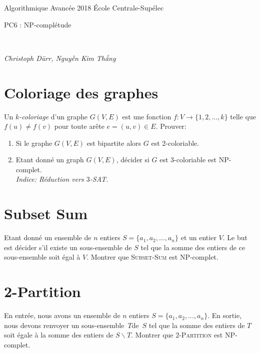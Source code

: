 \documentclass[12pt]{article}
\newcommand{\MakeScribeTop}[1]{
\noindent
\begin{framed}
\noindent
 Algorithmique Avancée 2018
 \hfill
 École Centrale-Supélec
 \\[1em]
 \centerline{ \Large
#1
 }
 \\[1em]
\centerline{  \it Christoph Dürr, Nguyễn Kim Thắng}
\end{framed}
}
\begin{document}
    \MakeScribeTop{PC6 : NP-complétude}

\section{Coloriage des graphes}
Un \emph{$k$-coloriage} d'un graphe $G(V,E)$ est une fonction $f: V \rightarrow \{1,2, \ldots, k\}$ telle que 
$f(u) \neq f(v)$ pour toute arête $e = (u,v) \in E$. Prouver:
\begin{enumerate}
	\item Si le graphe $G(V,E)$ est bipartite alors $G$ est 2-coloriable.
	\item Etant donné un graph $G(V,E)$, décider si $G$ est 3-coloriable est NP-complet. \\
		\emph{Indice: Réduction vers $3$-SAT.}
\end{enumerate} 

\section{Subset Sum}
Etant donné un ensemble de $n$ entiers $S=\{a_1, a_2, \ldots, a_n\}$ et un entier $V$. 
Le but est décider s'il existe un sous-ensemble de $S$ tel que la somme des entiers de ce sous-ensemble soit égal à $V$.
Montrer que \textsc{Subset-Sum} est NP-complet.

%


%
\section{2-Partition}
En entrée, nous avons un ensemble de $n$ entiers $S=\{a_1, a_2, \ldots, a_n\}$. En sortie, nous devons renvoyer 
un sous-ensemble~$T$de~$S$ tel que la somme des entiers de $T$ soit égale à la somme des entiers de $S\backslash T$.
Montrer que \textsc{2-Partition} est NP-complet.
\end{document}
